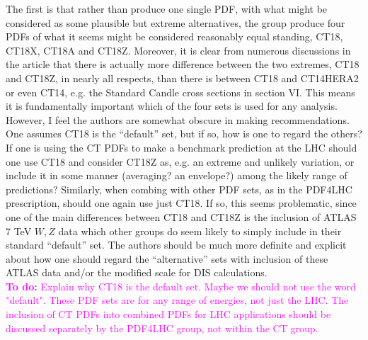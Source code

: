 \documentclass[aps,prd,amsmath,nofootinbib,floatfix,fleqn]{revtex4}
\newcommand{\TODO}[1]{\textcolor{magenta}{
\quad\vspace{3pt} \\ {\bf To do:} #1 \\
}}
\begin{document}
The first is that rather than produce one single PDF, with what might be
considered as some plausible but extreme alternatives, the group produce four
PDFs of what it seems might be considered reasonably equal standing, CT18,
CT18X, CT18A and CT18Z. Moreover, it is clear from numerous discussions in the
article that there is actually more difference between the two extremes, CT18
and CT18Z, in nearly all respects, than  there is between CT18 and CT14HERA2 or
even CT14, e.g. the Standard Candle cross sections in section VI.
This means it is fundamentally important which of the four sets is used for any
analysis. However, I feel the authors are somewhat obscure in making
recommendations. One assumes CT18 is the ``default'' set, but if so, how is one
to regard the others? If one is using the CT PDFs to make a benchmark prediction
at the LHC should one use CT18 and consider CT18Z as, e.g. an extreme and
unlikely variation, or include it in some manner (averaging? an envelope?) among
the likely range of predictions? Similarly, when combing with other PDF sets, as
in the PDF4LHC prescription, should one again use just CT18. If so, this seems
problematic, since one of the
main differences between CT18 and CT18Z is the inclusion of ATLAS 7 TeV $W,Z$
data which other groups do seem likely to simply include in their standard
``default'' set. The authors should be much more definite and explicit about how
one should regard the ``alternative'' sets with inclusion of these ATLAS data
and/or the modified scale for DIS calculations.
\TODO{Explain why CT18 is the default set. Maybe we should not use the word "default". These PDF sets are for any range of energies, not just the LHC. The inclusion of CT PDFs into combined PDFs for LHC applications should be discussed separately by the PDF4LHC group, not within the CT group.}
\end{document}
